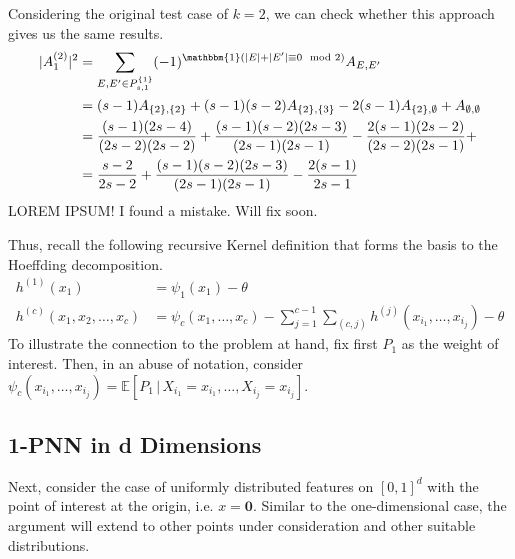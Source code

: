 \documentclass[letterpaper,10pt]{article}
\numberwithin{equation}{section}
\numberwithin{thm}{section}
\numberwithin{lem}{section}
\numberwithin{cor}{section}
\newcommand{\1}{\mathbb{1}}
\begin{document}
Considering the original test case of $k = 2$, we can check whether this approach gives us the same results.
\begin{equation*}
	\begin{aligned}
		|A_1^{(2)}|^2
		 & = \sum_{E, E' \in P_{s,1}^{\{1\}}} (-1)^{\mathbbm{1}(|E| + | E'| \equiv 0 \mod 2)}A_{E, E'}                                        \\
		 & = (s-1)A_{\{2\},\{2\}} + (s-1)(s-2)A_{\{2\},\{3\}} - 2(s-1)A_{\{2\}, \emptyset} + A_{\emptyset, \emptyset}                         \\
		 & = \frac{(s-1)(2s - 4)}{(2s - 2)(2s - 2)} + \frac{(s-1)(s-2)(2s - 3)}{(2s - 1)(2s - 1)} - \frac{2(s-1)(2s - 2)}{(2s - 2)(2s - 1)} + \\
		 & = \frac{s - 2}{2s - 2} + \frac{(s-1)(s-2)(2s - 3)}{(2s - 1)(2s - 1)} - \frac{2(s-1)}{2s - 1}                                       \\
	\end{aligned}
\end{equation*}
{\color{red} LOREM IPSUM! I found a mistake. Will fix soon.}

Thus, recall the following recursive Kernel definition that forms the basis to the Hoeffding decomposition.
\begin{align*}
	h^{(1)}(x_1)
	 & = \psi_1(x_1) - \theta                                                                                \\
	h^{(c)}(x_1, x_2, \dotsc, x_c)
	 & = \psi_c(x_1, \dotsc, x_c) - \sum_{j = 1}^{c-1}\sum_{(c,j)}h^{(j)}(x_{i_1}, \dotsc, x_{i_j}) - \theta
\end{align*}
To illustrate the connection to the problem at hand, fix first $P_1$ as the weight of interest.
Then, in an abuse of notation, consider $\psi_c(x_{i_1}, \dotsc, x_{i_j}) = \mathbb{E}\left[P_1 \, | \, X_{i_1} = x_{i_1}, \dotsc, X_{i_j} = x_{i_j}\right]$.

\subsection{1-PNN in d Dimensions}

Next, consider the case of uniformly distributed features on $[0,1]^d$ with the point of interest at the origin, i.e. $x = \mathbf{0}$.
Similar to the one-dimensional case, the argument will extend to other points under consideration and other suitable distributions.
\end{document}
